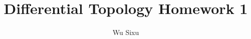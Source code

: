 \documentclass[a4paper]{article}
\begin{document}
\title{Differential Topology Homework 1}
	\author{Wu Sixu}
\maketitle


\end{document}
